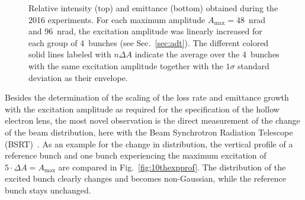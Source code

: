 \documentclass[%
 reprint,
 amsmath,amssymb,
 aps,
prstab,
]{revtex4-1}
\begin{document}
\begin{figure}[h]
\begin{minipage}[t]{0.49\linewidth}
	\end{minipage}	
	\caption{\label{fig:10thexp} Relative intensity (top) and emittance (bottom) obtained during the 2016 experiments. For each maximum amplitude $A_{\mathrm{max}}=48$~nrad and 96~nrad, the excitation amplitude was linearly increased for each group of 4~bunches (see Sec.~\ref{sec:adt}). The different colored solid lines labeled with $n\Delta A$ indicate the average over the 4~bunches with the same excitation amplitude together with the $1\sigma$ standard deviation as their envelope.}
\end{figure}

Besides the determination of the scaling of the loss rate and emittance growth with the excitation amplitude as required for the specification of the hollow electron lens, the most novel observation is the direct measurement of the change of the beam distribution, here with the Beam Synchrotron Radiation Telescope (BSRT)~\cite{bsrtprofinj}. As an example for the change in distribution, the vertical profile of a reference bunch and one bunch experiencing the maximum excitation of $5\cdot\Delta A=A_{\mathrm{max}}$ are compared in Fig.~\ref{fig:10thexpprof}. The distribution of the excited bunch clearly changes and becomes non-Gaussian, while the reference bunch stays unchanged.
\end{document}
